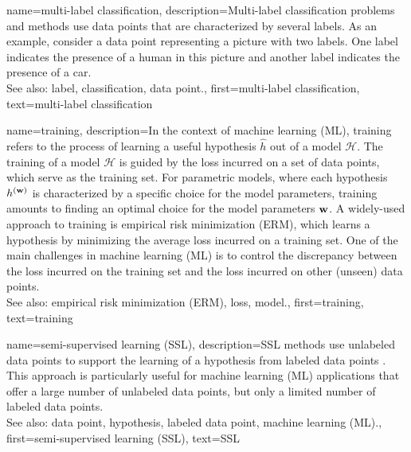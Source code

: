 {
{name={multi-label classification}, 
	description={Multi-label 
		classification problems and methods use data points 
		that are characterized by several labels. As an example, consider a data point 
		representing a picture with two labels. One label indicates the presence of a human 
		in this picture and another label indicates the presence of a car.
				\\
		See also: label, classification, data point.},
	    first={multi-label classification},
	    text={multi-label classification} 
}

{name={training}, 
	description={In the context of machine learning (ML), training refers to the process 
	of learning a useful hypothesis $\hat{h}$ out of a model $\mathcal{H}$. 
	The training of a model $\mathcal{H}$ is guided by the loss incurred on a set 
	of data points, which serve as the training set. For parametric models, 
	where each hypothesis $h^{({\bf w})}$ is characterized by a specific 
	choice for the model parameters, training amounts to finding an optimal choice for the 
	model parameters ${\bf w}$. A widely-used approach to training is empirical risk minimization (ERM), which 
	learns a hypothesis by minimizing the average loss incurred on a training set. 
	One of the main challenges in machine learning (ML) is to control the discrepancy between the 
	loss incurred on the training set and the loss incurred on other (unseen) data points.
				\\
		See also: empirical risk minimization (ERM), loss, model.},
	    first={training},
	    text={training} 
}


{name={semi-supervised learning (SSL)}, 
	description={SSL methods use unlabeled data points
		to support the learning of a hypothesis from labeled data points \cite{SemiSupervisedBook}. 
		This approach is particularly useful for machine learning (ML) applications that offer a large number of 
		unlabeled data points, but only a limited number of labeled data points.
			\\
		See also: data point, hypothesis, labeled data point, machine learning (ML).}, 
	first={semi-supervised learning (SSL)},
	text={SSL} 
}
	
}
